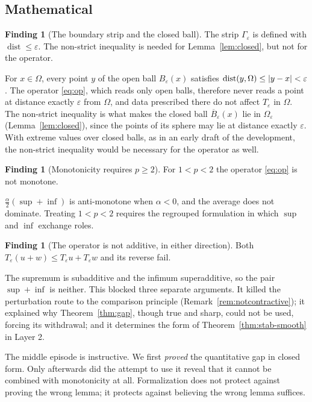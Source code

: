 \documentclass[11pt,reqno]{amsart}
\newcommand{\eps}{\varepsilon}
\newcommand{\Op}{T_\eps}
\DeclarePairedDelimiter{\abs}{\lvert}{\rvert}
\theoremstyle{plain}
\theoremstyle{definition}
\newtheorem{finding}[theorem]{Finding}
\begin{document}
\subsection{Mathematical}

\begin{finding}[The boundary strip and the closed ball]\label{find:strip}
The strip $\Gamma_\eps$ is defined with $\operatorname{dist} \le \eps$. The
non-strict inequality is needed for Lemma~\ref{lem:closed}, but not for the
operator.
\end{finding}

For $x \in \Omega$, every point $y$ of the open ball $B_\eps(x)$ satisfies
$\operatorname{dist}(y, \Omega) \le \abs{y - x} < \eps$. The operator
\eqref{eq:op}, which reads only open balls, therefore never reads a point at
distance exactly $\eps$ from $\Omega$, and data prescribed there do not affect
$\Op$ in $\Omega$. The non-strict inequality is what makes the closed ball
$\overline B_\eps(x)$ lie in $\Omega_\eps$ (Lemma~\ref{lem:closed}), since the
points of its sphere may lie at distance exactly $\eps$. With extreme values
over closed balls, as in an early draft of the development, the non-strict
inequality would be necessary for the operator as well.

\begin{finding}[Monotonicity requires $p \ge 2$]\label{find:prange}
For $1<p<2$ the operator \eqref{eq:op} is not monotone.
\end{finding}

$\tfrac{\alpha}{2}(\sup+\inf)$ is anti-monotone when $\alpha<0$, and the
average does not dominate. Treating $1<p<2$ requires the regrouped formulation
in which $\sup$ and $\inf$ exchange roles.

\begin{finding}[The operator is not additive, in either
direction]\label{find:notadd}
Both $\Op(u+w) \le \Op u + \Op w$ and its reverse fail.
\end{finding}

The supremum is subadditive and the infimum superadditive, so the pair
$\sup+\inf$ is neither. This blocked three separate arguments. It killed the
perturbation route to the comparison principle
(Remark~\ref{rem:notcontractive}); it explained why Theorem~\ref{thm:gap},
though true and sharp, could not be used, forcing its withdrawal; and it
determines the form of Theorem~\ref{thm:stab-smooth} in Layer 2.

The middle episode is instructive. We first \emph{proved} the quantitative gap
in closed form. Only afterwards did the attempt to use it reveal that it cannot
be combined with monotonicity at all. Formalization does not protect against
proving the wrong lemma; it protects against believing the wrong lemma
suffices.
\end{document}
